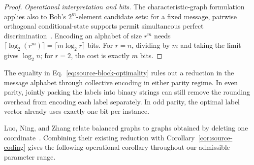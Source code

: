 \documentclass[11pt,a4paper]{article}
\numberwithin{equation}{section}
\numberwithin{figure}{section}
\numberwithin{table}{section}
\numberwithin{footnote}{section}
\theoremstyle{informal}\newtheorem*{informaltheorem}{Informal theorem}
\theoremstyle{definition}\newtheorem{example}{Example}[section]
\theoremstyle{remark}\newtheorem{remark}[theorem]{Remark}
\begin{document}
\begin{proof}
\emph{Operational interpretation and bits.}
The characteristic-graph formulation applies also to Bob's
\(2^m\)-element candidate sets: for a fixed message, pairwise
orthogonal conditional-state supports permit simultaneous perfect
discrimination~\cite[Lemma~1.2]{bblps}.
Encoding an alphabet of size \(r^m\) needs
\(\lceil\log_2(r^m)\rceil=\lceil m\log_2 r\rceil\) bits.
For \(r=n\), dividing by \(m\) and taking the limit gives
\(\log_2 n\); for \(r=2\), the cost is exactly \(m\) bits.
\end{proof}

The equality in Eq.~\eqref{eq:source-block-optimality} rules out a
reduction in the message alphabet through collective encoding in
either parity regime. In even parity, jointly packing the labels into
binary strings can still remove the rounding overhead from encoding
each label separately. In odd parity, the optimal label vector already
uses exactly one bit per instance.

Luo, Ning, and Zhang relate balanced graphs to graphs obtained by
deleting one coordinate~\cite[Theorem~6 and Corollary~7]{lnz}.
Combining their existing reduction with
Corollary~\ref{cor:source-coding} gives the following operational
corollary throughout our admissible parameter range.
\end{document}
